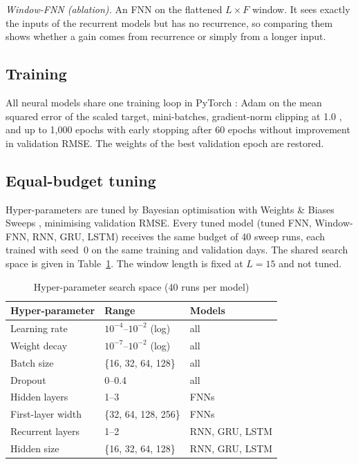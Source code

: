 \documentclass[conference]{IEEEtran}
\begin{document}
\emph{Window-FNN (ablation).} An FNN on the flattened $L\times F$ window. It sees exactly the
inputs of the recurrent models but has no recurrence, so comparing them shows whether a gain
comes from recurrence or simply from a longer input.

\subsection{Training}
All neural models share one training loop in PyTorch \cite{paszke2019}: Adam
\cite{kingma2015} on the mean squared error of the scaled target, mini-batches, gradient-norm
clipping at 1.0 \cite{pascanu2013}, and up to 1,000 epochs with early stopping after 60 epochs
without improvement in validation RMSE. The weights of the best validation epoch are restored.

\subsection{Equal-budget tuning}
Hyper-parameters are tuned by Bayesian optimisation \cite{snoek2012} with Weights \& Biases
Sweeps \cite{biewald2020}, minimising validation RMSE. Every tuned model (tuned FNN,
Window-FNN, RNN, GRU, LSTM) receives the same budget of 40 sweep runs, each trained with seed~0
on the same training and validation days. The shared search space is given in
Table~\ref{tab:hp}. The window length is fixed at $L=15$ and not tuned.

\begin{table}[!t]
\centering
\caption{Hyper-parameter search space (40 runs per model)}
\label{tab:hp}
\begin{tabular}{@{}lll@{}}
\toprule
Hyper-parameter & Range & Models \\
\midrule
Learning rate & $10^{-4}$--$10^{-2}$ (log) & all \\
Weight decay & $10^{-7}$--$10^{-2}$ (log) & all \\
Batch size & \{16, 32, 64, 128\} & all \\
Dropout & 0--0.4 & all \\
Hidden layers & 1--3 & FNNs \\
First-layer width & \{32, 64, 128, 256\} & FNNs \\
Recurrent layers & 1--2 & RNN, GRU, LSTM \\
Hidden size & \{16, 32, 64, 128\} & RNN, GRU, LSTM \\
\bottomrule
\end{tabular}
\end{table}
\end{document}
